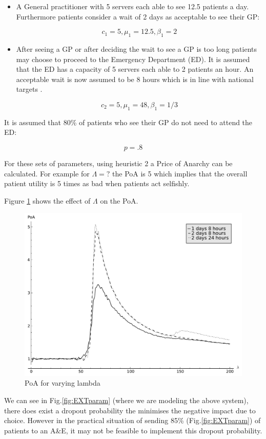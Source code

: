 \documentclass[12pt]{article}
\begin{document}
\begin{itemize}
    \item A General practitioner with 5 servers each able to see 12.5 patients a day. Furthermore patients consider a wait of 2 days as acceptable to see their GP:

        $$c_1=5, \mu_1=12.5, \beta_1=2$$

    \item After seeing a GP or after deciding the wait to see a GP is too long \cite{FINDSOMEPOPNEWSABOUTTHIS} patients may choose to proceed to the Emergency Department (ED). It is assumed that the ED has a capacity of 5 servers each able to 2 patients an hour. An acceptable wait is now assumed to be 8 hours which is in line with national targets \cite{}.

        $$c_2=5, \mu_1=48, \beta_1=1/3$$
\end{itemize}

It is assumed that 80\% of patients who see their GP do not need to attend the ED:

$$p=.8$$

For these sets of parameters, using heuristic 2 a Price of Anarchy can be calculated.
For example for $\Lambda=?$ the PoA is 5 which implies that the overall patient utility is 5 times as bad when patients act selfishly.

Figure \ref{ana_lambda} shows the effect of $\Lambda$ on the PoA.


\begin{figure}[!hbtp]
    \begin{center}
        \includegraphics[width=.5\textwidth]{Images/Ana_Lambda.pdf}
    \end{center}
    \caption{PoA for varying lambda}\label{ana_lambda}
\end{figure}
We can see in Fig.\ref{fig:EXTparam} (where we are modeling the above system), there does exist a dropout probability the minimises the negative impact due to choice. However in the practical situation of sending 85\% (Fig.\ref{fig:EXTparam}) of patients to an A\&E, it may not be feasible to implement this dropout probability.
\end{document}
